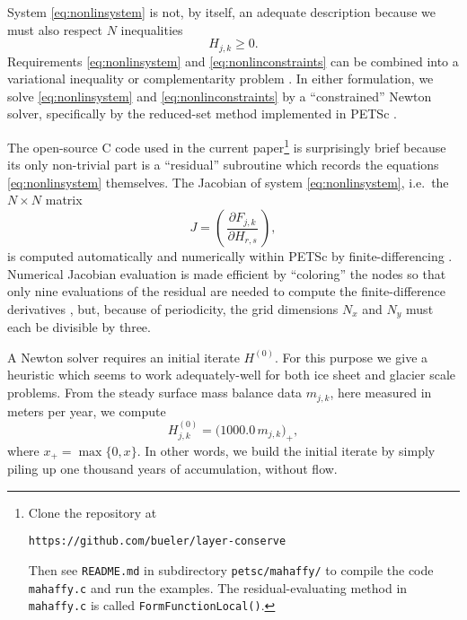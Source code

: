 \documentclass[twocolumn,letterpaper]{igs}
\begin{document}
System \eqref{eq:nonlinsystem} is not, by itself, an adequate description because we must also respect $N$ inequalities
\begin{equation}
H_{j,k} \ge 0.  \label{eq:nonlinconstraints}
\end{equation}
Requirements \eqref{eq:nonlinsystem} and \eqref{eq:nonlinconstraints} can be combined into a variational inequality \citep{JouvetBueler2012,KinderlehrerStampacchia1980} or complementarity problem \citep{BensonMunson2006}.  In either formulation, we solve \eqref{eq:nonlinsystem} and \eqref{eq:nonlinconstraints} by a ``constrained'' Newton solver, specifically by the reduced-set method \citep{BensonMunson2006} implemented in PETSc \citep{Balayetal2014}.

The open-source C code used in the current paper\footnote{Clone the repository at \begin{center}\texttt{https://github.com/bueler/layer-conserve}\end{center}  Then see \texttt{README.md} in subdirectory \texttt{petsc/mahaffy/} to compile the code \texttt{mahaffy.c} and run the examples.  The residual-evaluating method in \texttt{mahaffy.c} is called \texttt{FormFunctionLocal()}.} is surprisingly brief because its only non-trivial part is a ``residual'' subroutine which records the equations \eqref{eq:nonlinsystem} themselves.  The Jacobian of system \eqref{eq:nonlinsystem}, i.e.~the $N\times N$ matrix
\begin{equation}
J = \left(\,\frac{\partial F_{j,k}}{\partial H_{r,s}}\,\right),
\end{equation}
is computed automatically and numerically within PETSc by finite-differencing \citep{Kelley2003}.  Numerical Jacobian evaluation is made efficient by ``coloring'' the nodes so that only nine evaluations of the residual are needed to compute the finite-difference derivatives \citep{CurtisPowellReid1974}, but, because of periodicity, the grid dimensions $N_x$ and $N_y$ must each be divisible by three.

A Newton solver requires an initial iterate $H^{(0)}$.  For this purpose we give a heuristic which seems to work adequately-well for both ice sheet and glacier scale problems.  From the steady surface mass balance data $m_{j,k}$, here measured in meters per year, we compute
\begin{equation}
H_{j,k}^{(0)} = \big(1000.0\,m_{j,k}\big)_+,  \label{eq:nonlininitialheuristic}
\end{equation}
where $x_+ = \max\{0,x\}$.  In other words, we build the initial iterate by simply piling up one thousand years of accumulation, without flow.
\end{document}

